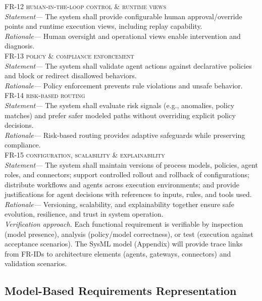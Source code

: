 \noindent \textsc{FR-12 human-in-the-loop control \& runtime views} \\
\indent \emph{Statement—} The system shall provide configurable human approval/override points and runtime execution views, including replay capability. \\
\indent \emph{Rationale—} Human oversight and operational views enable intervention and diagnosis. \\

\noindent \textsc{FR-13 policy \& compliance enforcement} \\
\indent \emph{Statement—} The system shall validate agent actions against declarative policies and block or redirect disallowed behaviors. \\
\indent \emph{Rationale—} Policy enforcement prevents rule violations and unsafe behavior. \\

\noindent \textsc{FR-14 risk-based routing} \\
\indent \emph{Statement—} The system shall evaluate risk signals (e.g., anomalies, policy matches) and prefer safer modeled paths without overriding explicit policy decisions. \\
\indent \emph{Rationale—} Risk-based routing provides adaptive safeguards while preserving compliance. \\

\noindent \textsc{FR-15 configuration, scalability \& explainability} \\
\indent \emph{Statement—} The system shall maintain versions of process models, policies, agent roles, and connectors; support controlled rollout and rollback of configurations; distribute workflows and agents across execution environments; and provide justifications for agent decisions with references to inputs, rules, and tools used. \\
\indent \emph{Rationale—} Versioning, scalability, and explainability together ensure safe evolution, resilience, and trust in system operation. \\

\noindent\emph{Verification approach.} Each functional requirement is verifiable by inspection (model presence), analysis (policy/model correctness), or test (execution against acceptance scenarios). The SysML model (Appendix) will provide trace links from FR-IDs to architecture elements (agents, gateways, connectors) and validation scenarios.

\subsection{Model-Based Requirements Representation}\label{subsec:req-model}


